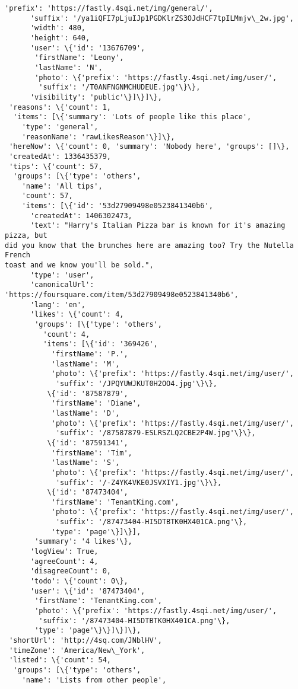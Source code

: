 \documentclass[11pt]{article}
\begin{document}
\begin{tcolorbox}[breakable, size=fbox, boxrule=.5pt, pad at break*=1mm, opacityfill=0]
\begin{Verbatim}[commandchars=\\\{\}]
      'prefix': 'https://fastly.4sqi.net/img/general/',
      'suffix': '/ya1iQFI7pLjuIJp1PGDKlrZS3OJdHCF7tpILMmjv\_2w.jpg',
      'width': 480,
      'height': 640,
      'user': \{'id': '13676709',
       'firstName': 'Leony',
       'lastName': 'N',
       'photo': \{'prefix': 'https://fastly.4sqi.net/img/user/',
        'suffix': '/T0ANFNGNMCHUDEUE.jpg'\}\},
      'visibility': 'public'\}]\}]\},
 'reasons': \{'count': 1,
  'items': [\{'summary': 'Lots of people like this place',
    'type': 'general',
    'reasonName': 'rawLikesReason'\}]\},
 'hereNow': \{'count': 0, 'summary': 'Nobody here', 'groups': []\},
 'createdAt': 1336435379,
 'tips': \{'count': 57,
  'groups': [\{'type': 'others',
    'name': 'All tips',
    'count': 57,
    'items': [\{'id': '53d27909498e0523841340b6',
      'createdAt': 1406302473,
      'text': "Harry's Italian Pizza bar is known for it's amazing pizza, but
did you know that the brunches here are amazing too? Try the Nutella French
toast and we know you'll be sold.",
      'type': 'user',
      'canonicalUrl': 'https://foursquare.com/item/53d27909498e0523841340b6',
      'lang': 'en',
      'likes': \{'count': 4,
       'groups': [\{'type': 'others',
         'count': 4,
         'items': [\{'id': '369426',
           'firstName': 'P.',
           'lastName': 'M',
           'photo': \{'prefix': 'https://fastly.4sqi.net/img/user/',
            'suffix': '/JPQYUWJKUT0H2OO4.jpg'\}\},
          \{'id': '87587879',
           'firstName': 'Diane',
           'lastName': 'D',
           'photo': \{'prefix': 'https://fastly.4sqi.net/img/user/',
            'suffix': '/87587879-ESLRSZLQ2CBE2P4W.jpg'\}\},
          \{'id': '87591341',
           'firstName': 'Tim',
           'lastName': 'S',
           'photo': \{'prefix': 'https://fastly.4sqi.net/img/user/',
            'suffix': '/-Z4YK4VKE0JSVXIY1.jpg'\}\},
          \{'id': '87473404',
           'firstName': 'TenantKing.com',
           'photo': \{'prefix': 'https://fastly.4sqi.net/img/user/',
            'suffix': '/87473404-HI5DTBTK0HX401CA.png'\},
           'type': 'page'\}]\}],
       'summary': '4 likes'\},
      'logView': True,
      'agreeCount': 4,
      'disagreeCount': 0,
      'todo': \{'count': 0\},
      'user': \{'id': '87473404',
       'firstName': 'TenantKing.com',
       'photo': \{'prefix': 'https://fastly.4sqi.net/img/user/',
        'suffix': '/87473404-HI5DTBTK0HX401CA.png'\},
       'type': 'page'\}\}]\}]\},
 'shortUrl': 'http://4sq.com/JNblHV',
 'timeZone': 'America/New\_York',
 'listed': \{'count': 54,
  'groups': [\{'type': 'others',
    'name': 'Lists from other people',

\end{Verbatim}
\end{tcolorbox}
\end{document}
